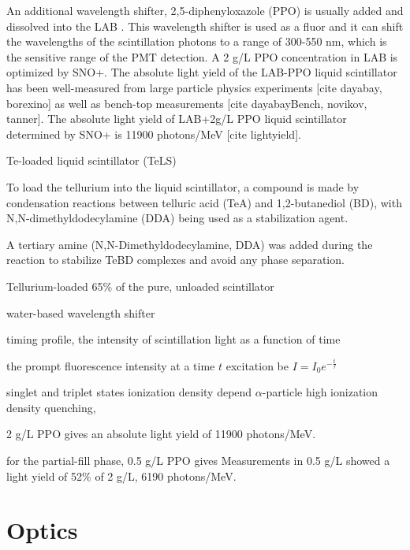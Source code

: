 An additional wavelength shifter, 2,5-diphenyloxazole (PPO) is usually added and dissolved into the LAB \cite{wunderly1990new}. This wavelength shifter is used as a fluor and it can shift the wavelengths of the scintillation photons to a range of 300-550 nm, which is the sensitive range of the PMT detection.  A 2 g/L PPO concentration in LAB is optimized by SNO+\cite{whitepaper}. The absolute light yield of the LAB-PPO liquid scintillator has been well-measured from large particle physics experiments [cite dayabay, borexino] as well as bench-top measurements [cite dayabayBench, novikov, tanner]. The absolute light yield of LAB+2g/L PPO liquid scintillator determined by SNO+ is 11900 photons/MeV [cite lightyield].



Te-loaded liquid scintillator (TeLS)

To load the tellurium into the liquid scintillator, a compound is made by 
condensation reactions between telluric acid (TeA) and 1,2-butanediol (BD), with N,N-dimethyldodecylamine (DDA) being used as a stabilization agent.

A tertiary amine (N,N-Dimethyldodecylamine, DDA) was added during the reaction to stabilize TeBD complexes and avoid any phase separation. 




Tellurium-loaded 65\% of the pure, unloaded scintillator



water-based wavelength shifter


timing profile, the intensity of scintillation light as a function of time

the prompt fluorescence intensity at a time $t$ excitation be $I=I_0e^{-\frac{t}{\tau}}$



singlet and triplet states 
ionization density 
depend
$\alpha$-particle
high ionization density 
quenching, 




2 g/L PPO gives an absolute light yield of 11900 photons/MeV.


for the partial-fill phase, 0.5 g/L PPO gives Measurements in 0.5 g/L showed a light yield of 52\% of 2 g/L,  
6190 photons/MeV\cite{tanner0p5,joshW1}.





\section{Optics}

